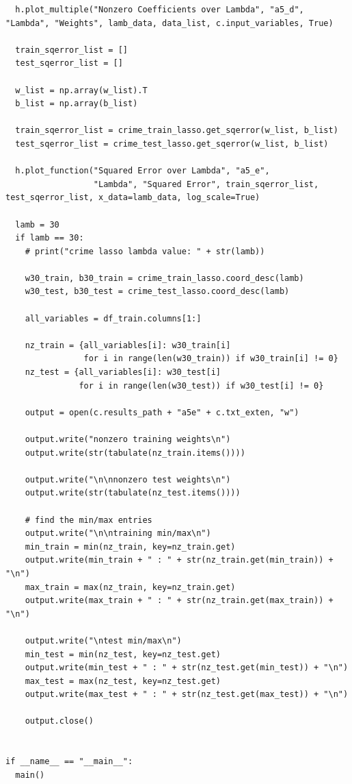 \documentclass{article}
\newcommand{\1}{\mathbf{1}}
\begin{document}
{\begin{verbatim}
  h.plot_multiple("Nonzero Coefficients over Lambda", "a5_d", "Lambda", "Weights", lamb_data, data_list, c.input_variables, True)

  train_sqerror_list = []
  test_sqerror_list = []

  w_list = np.array(w_list).T
  b_list = np.array(b_list)

  train_sqerror_list = crime_train_lasso.get_sqerror(w_list, b_list)
  test_sqerror_list = crime_test_lasso.get_sqerror(w_list, b_list)

  h.plot_function("Squared Error over Lambda", "a5_e",
                  "Lambda", "Squared Error", train_sqerror_list, test_sqerror_list, x_data=lamb_data, log_scale=True)

  lamb = 30
  if lamb == 30:
    # print("crime lasso lambda value: " + str(lamb))

    w30_train, b30_train = crime_train_lasso.coord_desc(lamb)
    w30_test, b30_test = crime_test_lasso.coord_desc(lamb)

    all_variables = df_train.columns[1:]

    nz_train = {all_variables[i]: w30_train[i]
                for i in range(len(w30_train)) if w30_train[i] != 0}
    nz_test = {all_variables[i]: w30_test[i]
               for i in range(len(w30_test)) if w30_test[i] != 0}

    output = open(c.results_path + "a5e" + c.txt_exten, "w")

    output.write("nonzero training weights\n")
    output.write(str(tabulate(nz_train.items())))
    
    output.write("\n\nnonzero test weights\n")
    output.write(str(tabulate(nz_test.items())))

    # find the min/max entries
    output.write("\n\ntraining min/max\n")
    min_train = min(nz_train, key=nz_train.get)
    output.write(min_train + " : " + str(nz_train.get(min_train)) + "\n")
    max_train = max(nz_train, key=nz_train.get)
    output.write(max_train + " : " + str(nz_train.get(max_train)) + "\n")

    output.write("\ntest min/max\n")
    min_test = min(nz_test, key=nz_test.get)
    output.write(min_test + " : " + str(nz_test.get(min_test)) + "\n")
    max_test = max(nz_test, key=nz_test.get)
    output.write(max_test + " : " + str(nz_test.get(max_test)) + "\n")

    output.close()


if __name__ == "__main__":
  main()

\end{verbatim}

}
\end{document}
